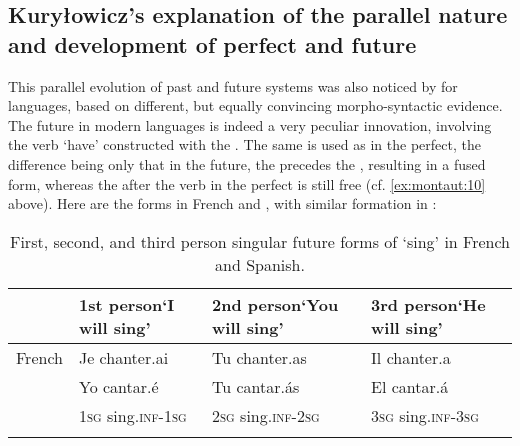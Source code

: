 \documentclass[output=paper]{langsci/langscibook}
\begin{document}
\subsection{Kuryłowicz’s explanation of the parallel nature and development of perfect and future}\label{sec:montaut:3.2}

This parallel evolution of past and future systems was also noticed by \citet{Kuryłowicz1931,Kuryłowicz1965} for  languages, based on different, but equally convincing morpho-syntactic evidence. The future in modern  languages is indeed a very peculiar innovation, involving the verb `have' constructed with the . The same  is used as in the perfect, the difference being only that in the future, the  precedes the , resulting in a fused form, whereas the  after the verb in the perfect is still free (cf. \ref{ex:montaut:10} above). Here are the forms in French and , with similar formation in :
\begin{table}
\begin{tabularx}{\textwidth}{lQQQ}
\lsptoprule
 & 1st person\newline `I will sing' & 2nd person\newline `You will sing' & 3rd person\newline `He will sing'\\
\midrule
French & Je chanter.ai & Tu chanter.as & Il chanter.a\\
 & Yo cantar.é & Tu cantar.ás & El cantar.á\\
& \textsc{1sg} sing.\textsc{inf-1sg} & \textsc{2sg} sing.\textsc{inf-2sg} & \textsc{3sg} sing.\textsc{inf-3sg}\\
\lspbottomrule
\end{tabularx}
\caption{First, second, and third person singular future forms of ‘sing’ in French and Spanish.}
\label{tabmontaut:1}
\end{table}
\end{document}
